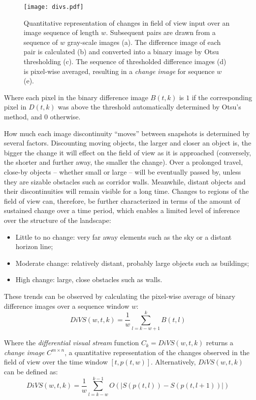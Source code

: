 \documentclass[twocolumn, 9pt,fleqn]{jsproceedings}
\begin{document}
\begin{figure}[h!]
\texttt{[image: divs.pdf]}
\caption{Quantitative representation of changes in field of view input over an image sequence of length $w$. Subsequent pairs are drawn from a sequence of $w$ gray-scale images (a). The difference image of each pair is calculated (b) and converted into a binary image by Otsu thresholding (c). The sequence of thresholded difference images (d) is pixel-wise averaged, resulting in a \textit{change image} for sequence $w$ (e).}
\label{fig:divs}
\end{figure}

Where each pixel in the binary difference image $B(t, k)$ is $1$ if the corresponding pixel in $D(t, k)$ was above the threshold automatically determined by Otsu's method, and $0$ otherwise.

How much each image discontinuity ``moves'' between snapshots is determined by several factors. Discounting moving objects, the larger and closer an object is, the bigger the change it will effect on the field of view as it is approached (conversely, the shorter and further away, the smaller the change). Over a prolonged travel, close-by objects -- whether small or large -- will be eventually passed by, unless they are sizable obstacles such as corridor walls. Meanwhile, distant objects and their discontinuities will remain visible for a long time. Changes to regions of the field of view can, therefore, be further characterized in terms of the amount of sustained change over a time period, which enables a limited level of inference over the structure of the landscape:

\begin{itemize}
\item Little to no change: very far away elements such as the sky or a distant horizon line;
\item Moderate change: relatively distant, probably large objects such as buildings;
\item High change: large, close obstacles such as walls.
\end{itemize}

These trends can be observed by calculating the pixel-wise average of binary difference images over a sequence window $w$:
\begin{equation}
DiVS(w, t, k) = \frac{1}{w} \sum_{l=k-w+1}^{k}{B(t, l)}
\end{equation}

Where the \textit{differential visual stream} function $C_k = DiVS(w, t, k)$ returns a  \textit{change image} $C^{m \times n}$, a quantitative representation of the changes observed in the field of view over the time window $[t, p(t, w)]$. Alternatively, $DiVS(w, t, k)$ can be defined as:
\begin{equation}
DiVS(w, t, k) = \frac{1}{w} \sum_{l=k-w}^{k-1}{O(|S(p(t, l)) - S(p(t, l+1))|)}
\end{equation}
\end{document}
